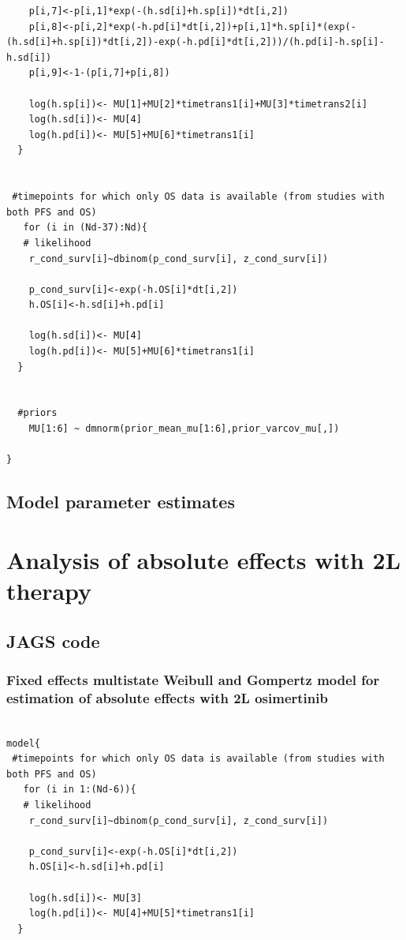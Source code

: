 \documentclass[11pt,final,fleqn]{article}\usepackage[]{graphicx}\usepackage[]{color}
\theoremstyle{plain}
\begin{document}
\begin{appendices}
\begin{verbatim}
    p[i,7]<-p[i,1]*exp(-(h.sd[i]+h.sp[i])*dt[i,2])
    p[i,8]<-p[i,2]*exp(-h.pd[i]*dt[i,2])+p[i,1]*h.sp[i]*(exp(-(h.sd[i]+h.sp[i])*dt[i,2])-exp(-h.pd[i]*dt[i,2]))/(h.pd[i]-h.sp[i]-h.sd[i])
    p[i,9]<-1-(p[i,7]+p[i,8])
    
    log(h.sp[i])<- MU[1]+MU[2]*timetrans1[i]+MU[3]*timetrans2[i] 
    log(h.sd[i])<- MU[4] 
    log(h.pd[i])<- MU[5]+MU[6]*timetrans1[i]
  }
  
  
 #timepoints for which only OS data is available (from studies with both PFS and OS)
   for (i in (Nd-37):Nd){
   # likelihood
    r_cond_surv[i]~dbinom(p_cond_surv[i], z_cond_surv[i]) 
    
    p_cond_surv[i]<-exp(-h.OS[i]*dt[i,2])
    h.OS[i]<-h.sd[i]+h.pd[i]
    
    log(h.sd[i])<- MU[4]
    log(h.pd[i])<- MU[5]+MU[6]*timetrans1[i]
  }
    
  
  #priors
    MU[1:6] ~ dmnorm(prior_mean_mu[1:6],prior_varcov_mu[,]) 
  
}

\end{verbatim}

\subsection{Model parameter estimates}


\section{Analysis of absolute effects with 2L therapy}
\subsection{JAGS code}

\subsubsection{Fixed effects multistate Weibull and Gompertz model for estimation of absolute effects with 2L osimertinib}  
\begin{verbatim} 

model{
 #timepoints for which only OS data is available (from studies with both PFS and OS)
   for (i in 1:(Nd-6)){
   # likelihood
    r_cond_surv[i]~dbinom(p_cond_surv[i], z_cond_surv[i]) 
    
    p_cond_surv[i]<-exp(-h.OS[i]*dt[i,2])
    h.OS[i]<-h.sd[i]+h.pd[i]
    
    log(h.sd[i])<- MU[3] 
    log(h.pd[i])<- MU[4]+MU[5]*timetrans1[i]
  }
    

\end{verbatim}
\end{appendices}
\end{document}
